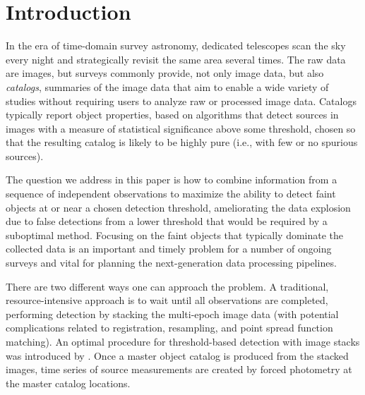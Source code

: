 \documentclass[twocolumn]{emulateapj}
\begin{document}


\section{Introduction}
\label{sec:intro}
\noindent
%
In the era of time-domain survey astronomy, dedicated telescopes scan the sky every night and strategically revisit the same area several times.
The raw data are images, but surveys commonly provide, not only image data, but also \emph{catalogs}, summaries of the image data that aim to enable a wide variety of studies without requiring users to analyze raw or processed image data.
Catalogs typically report object properties, based on algorithms that detect sources in images with a measure of statistical significance above some threshold, chosen so that the resulting catalog is likely to be highly pure (i.e., with few or no spurious sources).
 
The question we address in this paper is how to combine information from a sequence of independent observations to maximize the ability to detect faint objects at or near a chosen detection threshold, ameliorating the data explosion due to false detections from a lower threshold that would be required by a suboptimal method.
Focusing on the faint objects that typically dominate the collected data is an important and timely problem for a number of ongoing surveys and vital for planning the next-generation data processing pipelines.

There are two different ways one can approach the problem. 
A traditional, resource-intensive approach is to wait until all observations are completed, performing detection by stacking the multi-epoch image data (with potential complications related to registration, resampling, and point spread function matching).
An optimal procedure for threshold-based detection with image stacks was introduced by \citet{chisq}.
Once a master object catalog is produced from the stacked images, time series of source measurements are created by forced photometry at the master catalog locations.
\end{document}
